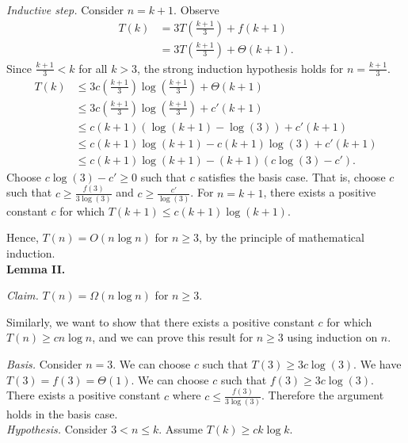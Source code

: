 \begin{enumerate}
\textit{Inductive step. }Consider $n=k+1$. Observe
\begin{align*}
T(k)&=3T\left(\frac{k+1}{3}\right)+f(k+1)\\
&=3T\left(\frac{k+1}{3}\right)+\Theta(k+1).
\end{align*}
Since $\frac{k+1}{3}<k$ for all $k>3$, the strong induction hypothesis holds for $n=\frac{k+1}{3}$.
\begin{align*}
T(k)&\leq 3c\left(\frac{k+1}{3}\right)\log\left(\frac{k+1}{3}\right)+\Theta(k+1)\\
&\leq 3c\left(\frac{k+1}{3}\right)\log\left(\frac{k+1}{3}\right)+c'(k+1)\\
&\leq c(k+1)(\log(k+1)-\log(3))+c'(k+1)\\
&\leq c(k+1)\log(k+1)-c(k+1)\log(3)+c'(k+1)\\
&\leq c(k+1)\log(k+1)-(k+1)(c\log(3)-c').
\end{align*}
Choose $c\log(3)-c'\geq 0$ such that $c$ satisfies the basis case. That is, choose $c$ such that $c\geq\frac{f(3)}{3\log(3)}$ and $c\geq\frac{c'}{\log(3)}$. For $n=k+1$, there exists a positive constant $c$ for which $T(k+1)\leq c(k+1)\log(k+1)$. 

Hence, $T(n)=O(n\log n)$ for $n\geq 3$, by the principle of mathematical induction.\\

\textbf{Lemma II. }

\textit{Claim. }$T(n)=\Omega(n\log n)$ for $n\geq 3$.

Similarly, we want to show that there exists a positive constant $c$ for which $T(n)\geq cn\log n$, and we can prove this result for $n\geq 3$ using induction on $n$.

\textit{Basis. }Consider $n=3$. We can choose $c$ such that $T(3)\geq 3c\log(3)$. We have $T(3)=f(3)=\Theta(1)$. We can choose $c$ such that $f(3)\geq 3c\log(3)$. There exists a positive constant $c$ where $c\leq\frac{f(3)}{3\log(3)}$. Therefore the argument holds in the basis case.\\

\textit{Hypothesis. }Consider $3<n\leq k$. Assume $T(k)\geq ck\log k$.\\


\end{enumerate}
